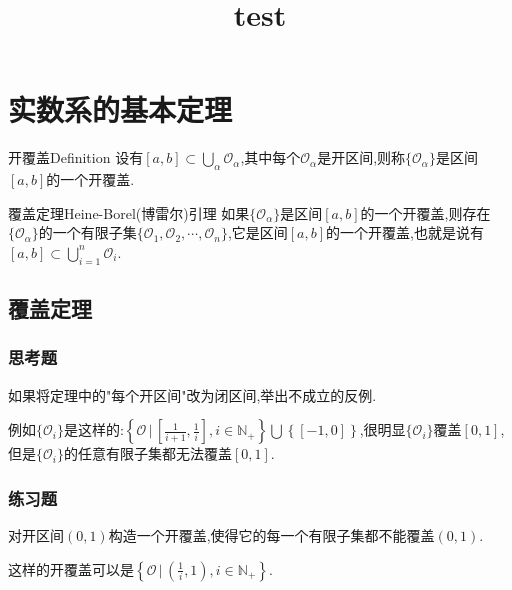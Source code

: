 \documentclass[cn,chinese,founder]{elegantbook}
\title{test}
\begin{document}
\chapter{实数系的基本定理}
 \begin{definition}{开覆盖}{Definition}
     设有$[a,b]\subset\textstyle\bigcup_\alpha\mathcal{O} _\alpha$,其中每个$\mathcal{O}_\alpha$是开区间,则称$\{\mathcal{O}_\alpha\}$是区间$[a,b]$的一个开覆盖.
 \end{definition}
 \begin{theorem}{覆盖定理}{Heine-Borel(博雷尔)引理}
     如果$\{\mathcal{O}_\alpha\}$是区间$[a,b]$的一个开覆盖,则存在$\{\mathcal{O}_\alpha\}$的一个有限子集$\{\mathcal{O}_1,\mathcal{O}_2,\cdots,\mathcal{O}_n\}$,它是区间$[a,b]$的一个开覆盖,也就是说有$[a,b]\subset\textstyle\bigcup_{i=1}^n\mathcal{O}_i$.
 \end{theorem}
 \section{覆盖定理}
  \subsection{思考题}
      \begin{example}
          如果将定理中的"每个开区间"改为闭区间,举出不成立的反例.
      \end{example}
      \begin{solution}
          例如$\{\mathcal{O}_i\}$是这样的:$\left\{\mathcal{O}\, \bigg|\, \left[\frac{1}{i+1},\frac{1}{i}\right],i\in \mathbb{N}_+\right\}\textstyle\bigcup\left\{[-1,0]\right\}$,很明显$\{\mathcal{O}_i\}$覆盖$\left[0,1\right]$,但是$\{\mathcal{O}_i\}$的任意有限子集都无法覆盖$\left[0,1\right]$.
      \end{solution}

  \subsection{练习题}
      \begin{exercise}
          对开区间$(0,1)$构造一个开覆盖,使得它的每一个有限子集都不能覆盖$(0,1)$.
      \end{exercise}
      \begin{solution}
          这样的开覆盖可以是$\left\{\mathcal{O}\, \bigg|\, \left(\frac{1}{i},1\right),i\in\mathbb{N}_+\right\}$.
      \end{solution}
\end{document}
